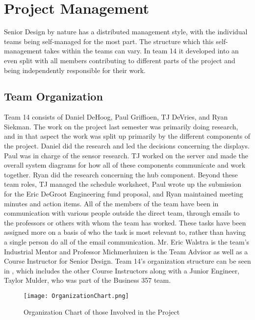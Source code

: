 \documentclass[PPFS.tex]{template/subfiles}
\begin{document}
\section{Project Management}
Senior Design by nature has a distributed management style, with the individual teams being self-managed for the most part. The structure which this self-management takes within the teams can vary. In team 14 it developed into an even split with all members contributing to different parts of the project and being independently responsible for their work.

    \subsection{Team Organization}
	Team 14 consists of Daniel DeHoog, Paul Griffioen, TJ DeVries, and Ryan Siekman. The work on the project last semester was primarily doing research, and in that aspect the work was split up primarily by the different components of the project. Daniel did the research and led the decisions concerning the displays. Paul was in charge of the sensor research. TJ worked on the server and made the overall system diagrams for how all of these components communicate and work together. Ryan did the research concerning the hub component. Beyond these team roles, TJ managed the schedule worksheet, Paul wrote up the submission for the Eric DeGroot Engineering fund proposal, and Ryan maintained meeting minutes and action items. All of the members of the team have been in communication with various people outside the direct team, through emails to the professors or others with whom the team has worked. These tasks have been assigned more on a basis of who the task is most relevant to, rather than having a single person do all of the email communication. Mr. Eric Walstra is the team's Industrial Mentor and Professor Michmerhuizen is the Team Advisor as well as a Course Instructor for Senior Design. Team 14's organization structure can be seen in , which includes the other Course Instructors along with a Junior Engineer, Taylor Mulder, who was part of the Business 357 team.
	
	\begin{figure}[h]
		\centering
		\texttt{[image: OrganizationChart.png]}
		\caption{Organization Chart of those Involved in the Project}
		\label{fig:OrganizationChart}
	\end{figure}
	
\end{document}
